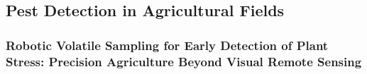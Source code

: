 \subsection{Pest Detection in Agricultural Fields}


\subsubsection{Robotic Volatile Sampling for Early Detection of Plant Stress: Precision Agriculture Beyond Visual Remote Sensing \cite{Geckeler2023a}}

